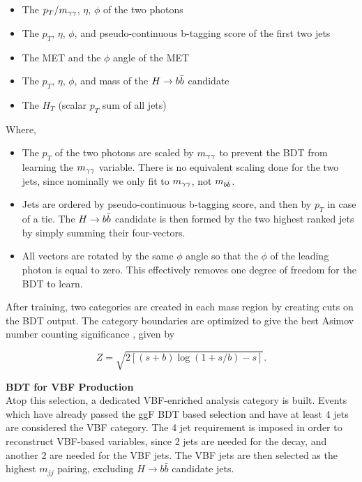 \begin{itemize}
	\item{The $p_{T}/m_{\gamma\gamma}$, $\eta$, $\phi$ of the two photons} 
	\item{The $p_{T}$, $\eta$, $\phi$, and pseudo-continuous b-tagging score of the first two jets}
	\item{The MET and the $\phi$ angle of the MET}
	\item{The $p_{T}$, $\eta$, $\phi$, and mass of the $H\rightarrow b\bar{b}$ candidate}
	\item{The $H_{T}$ (scalar $p_{T}$ sum of all jets)}
\end{itemize}

Where,

\begin{itemize}
	\item{The $p_{T}$ of the two photons are scaled by $m_{\gamma\gamma}$ to prevent the BDT from learning the $m_{\gamma\gamma}$ variable. There is no equivalent scaling done for the two jets, since nominally we only fit to $m_{\gamma\gamma}$, not $m_{b\bar{b}}$.}
	\item{Jets are ordered by pseudo-continuous b-tagging score, and then by $p_{T}$ in case of a tie. The $H \rightarrow b\bar{b}$ candidate is then formed by the two highest ranked jets by simply summing their four-vectors.}
	\item{All vectors are rotated by the same $\phi$ angle so that the $\phi$ of the leading photon is equal to zero. This effectively removes one degree of freedom for the BDT to learn.}
\end{itemize}

After training, two categories are created in each mass region by creating cuts on the BDT output. The category boundaries are optimized to give the best Asimov number counting significance \cite{asimov}, given by

\begin{equation}\label{eqn:asimov-significance}
    Z = \sqrt{2[(s+b)\log{(1 + s/b)} -s]}.
\end{equation}


\noindent\textbf{BDT for VBF Production}\\
\indent Atop this selection, a dedicated VBF-enriched analysis category is built. Events which have already passed the ggF BDT based selection and have at least 4 jets are considered the VBF category. The 4 jet requirement is imposed in order to reconstruct VBF-based variables, since 2 jets are needed for the \Hbb decay, and another 2 are needed for the VBF jets. The VBF jets are then selected as the highest $m_{jj}$ pairing, excluding $H\rightarrow b\bar{b}$ candidate jets.

